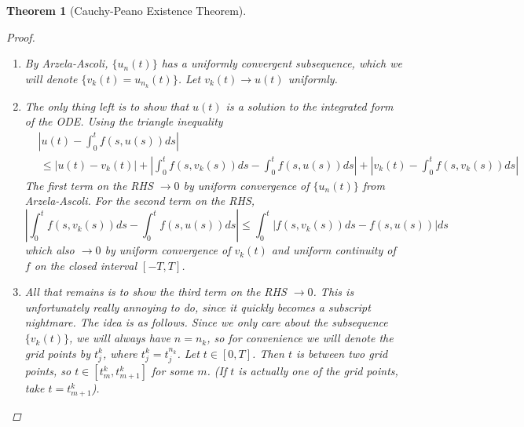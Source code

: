 \documentclass[10pt]{article}         %
\newtheorem{theorem}{Theorem}[section]
\theoremstyle{remark}
\begin{document}
\begin{theorem}[Cauchy-Peano Existence Theorem]
\begin{proof}
\begin{enumerate}
    \item By Arzela-Ascoli, $\{u_n(t) \}$ has a uniformly convergent subsequence, which we will denote $\{ v_k(t) = u_{n_k}(t) \}$. Let $v_k(t) \rightarrow u(t)$ uniformly. 
    
    \item The only thing left is to show that $u(t)$ is a solution to the integrated form of the ODE. Using the triangle inequality
    \begin{align*}
    &\left| u(t) - \int_0^t f(s, u(s))ds \right| \\
    &\,\leq |u(t) - v_k(t)| + \left| \int_0^t f(s, v_k(s))ds - \int_0^t f(s, u(s))ds \right| + \left| v_k(t) - \int_0^t f(s, v_k(s))ds \right|
    \end{align*}
    The first term on the RHS $\rightarrow 0$ by uniform convergence of $\{ u_n(t) \}$ from Arzela-Ascoli. For the second term on the RHS,
    \[
    \left| \int_0^t f(s, v_k(s))ds - \int_0^t f(s, u(s))ds \right|  
    \leq \int_0^t | f(s, v_k(s))ds - f(s, u(s))| ds
    \]
    which also $\rightarrow 0$ by uniform convergence of $v_k(t)$ and uniform continuity of $f$ on the closed interval $[-T, T]$.
    
    \item All that remains is to show the third term on the RHS $\rightarrow 0$. This is unfortunately really annoying to do, since it quickly becomes a subscript nightmare. The idea is as follows. Since we only care about the subsequence $\{v_k(t)\}$, we will always have $n = n_k$, so for convenience we will denote the grid points by $t_j^k$, where $t_j^k = t_j^{n_k}$. Let $t \in [0, T]$. Then $t$ is between two grid points, so $t \in [t_m^k, t_{m+1}^k]$ for some $m$. (If $t$ is actually one of the grid points, take $t = t_{m+1}^k$). 
    

\end{enumerate}
\end{proof}
\end{theorem}
\end{document}
